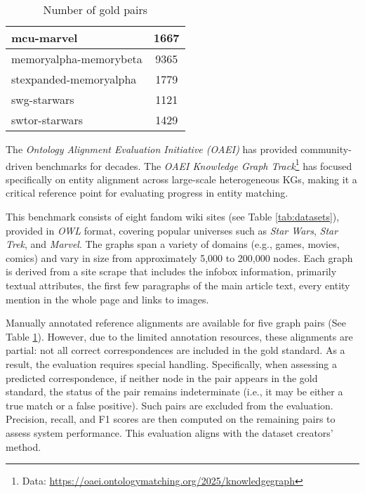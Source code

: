 \documentclass[11pt]{article}
\begin{document}
\begin{table}[h]
\centering

\begin{tabular}{l|c|}
\hline
\multicolumn{1}{|l|}{mcu-marvel}             & 1667                                \\ \hline
\multicolumn{1}{|l|}{memoryalpha-memorybeta} & 9365                                \\ \hline
\multicolumn{1}{|l|}{stexpanded-memoryalpha} & 1779                                \\ \hline
\multicolumn{1}{|l|}{swg-starwars}           & 1121                                \\ \hline
\multicolumn{1}{|l|}{swtor-starwars}         & 1429                                \\ \hline
\end{tabular}
\vspace{-6px}
\caption{Number of gold pairs}
\label{tab:golds}
\end{table}

The \emph{Ontology Alignment Evaluation Initiative (OAEI)} has provided community-driven benchmarks for decades. The \emph{OAEI Knowledge Graph Track}\footnote{Data: \url{https://oaei.ontologymatching.org/2025/knowledgegraph}} has focused specifically on entity alignment across large-scale heterogeneous KGs, making it a critical reference point for evaluating progress in entity matching.

This benchmark consists of eight fandom wiki sites (see Table \ref{tab:datasets}), provided in \textit{OWL} format, covering popular universes such as \textit{Star Wars}, \textit{Star Trek}, and \textit{Marvel}. The graphs span a variety of domains (e.g., games, movies, comics) and vary in size from approximately 5,000 to 200,000 nodes. Each graph is derived from a site scrape that includes the infobox information, primarily textual attributes, the first few paragraphs of the main article text, every entity mention in the whole page and links to images.

Manually annotated reference alignments are available for five graph pairs (See Table \ref{tab:golds}). However, due to the limited annotation resources, these alignments are partial: not all correct correspondences are included in the gold standard. As a result, the evaluation requires special handling. Specifically, when assessing a predicted correspondence, if neither node in the pair appears in the gold standard, the status of the pair remains indeterminate (i.e., it may be either a true match or a false positive). Such pairs are excluded from the evaluation. Precision, recall, and F1 scores are then computed on the remaining pairs to assess system performance. This evaluation aligns with the dataset creators' method.
\end{document}
